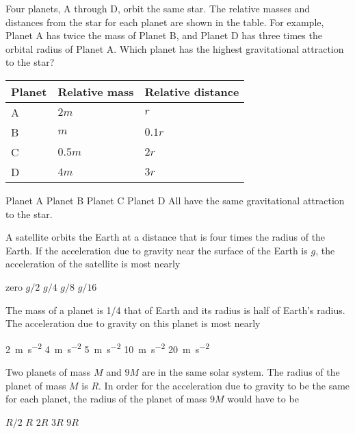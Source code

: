 \documentclass{../../../oss-ap12ibhl-print}
\begin{document}
\begin{questions}
  \question Four planets, A through D, orbit the same star. The relative masses
  and distances from the star for each planet are shown in the table. For
  example, Planet A has twice the mass of Planet B, and Planet D has three
  times the orbital radius of Planet A. Which planet has the highest
  gravitational attraction to the star?
  \begin{center}
    \vspace{-.1in}
    \begin{tabular}{lll}
      \hline
      \textbf{Planet} & \textbf{Relative mass} & \textbf{Relative distance}\\
      \hline
      A\hspace{.4in}& $2m$     & $r$    \\ \hline
      B & $m$                  & $0.1r$\hspace{.25in} \\ \hline
      C & $0.5m$\hspace{.25in} & $2r$   \\ \hline
      D & $4m$                 & $3r$   \\ \hline
    \end{tabular}
  \end{center}
  \begin{choices}
    \choice Planet A
    \choice Planet B
    \choice Planet C
    \choice Planet D
    \choice All have the same gravitational attraction to the star.
  \end{choices}

  \question A satellite orbits the Earth at a distance that is four times the
  radius of the Earth. If the acceleration due to gravity near the surface of
  the Earth is $g$, the acceleration of the satellite is most nearly
  \begin{choices}
    \choice zero
    \choice $g/2$
    \choice $g/4$
    \choice $g/8$
    \choice $g/16$
  \end{choices}

  \question The mass of a planet is 1/4 that of Earth and its radius is half of
  Earth's radius. The acceleration due to gravity on this planet is most nearly
  \begin{choices}
    \choice\SI{2}{\metre\per\second\squared}
    \choice\SI{4}{\metre\per\second\squared}
    \choice\SI{5}{\metre\per\second\squared}
    \choice\SI{10}{\metre\per\second\squared}
    \choice\SI{20}{\metre\per\second\squared}
  \end{choices}
  
  \question Two planets of mass $M$ and $9M$ are in the same solar system. The
  radius of the planet of mass $M$ is $R$. In order for the acceleration due
  to gravity to be the same for each planet, the radius of the planet of mass
  $9M$ would have to be
  \begin{choices}
    \choice $R/2$
    \choice $R$
    \choice $2R$
    \choice $3R$
    \choice $9R$
  \end{choices}
  \newpage
  

\end{questions}
\end{document}
